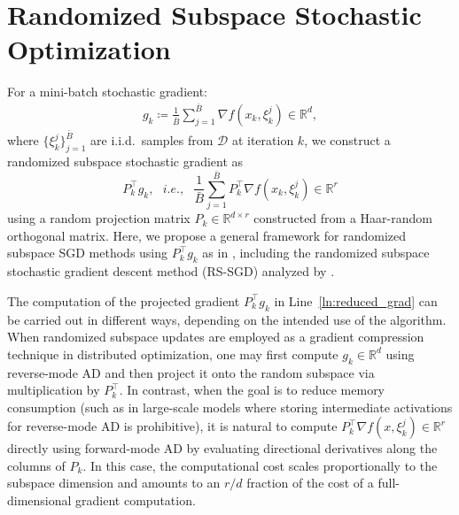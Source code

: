 \documentclass[10pt]{article}
\makeatletter
\newcommand{\alglinelabel}{
  \addtocounter{ALC@line}{-1}
  \refstepcounter{ALC@line}
  \label
}
\makeatother
\begin{document}
\section{Randomized Subspace Stochastic Optimization}
\label{sec:algorithm}
For a mini-batch stochastic gradient:
\begin{align*} 
\textstyle
g_k \coloneqq \frac{1}{\bar{B}} \sum_{j=1}^{\bar{B}} \nabla f(x_k, \xi_k^j) \in \mathbb{R}^d,
\end{align*}
where $\{\xi_k^j\}_{j=1}^{\bar{B}}$ are i.i.d.\ samples 
from $\mathcal{D}$ at iteration $k$, we construct
 a randomized subspace stochastic gradient as
\[
\textstyle
P_k^\top g_k, ~~~ { i.e., } ~~~
\frac{1}{\bar{B}} \sum_{j=1}^{\bar{B}} P_k^\top \nabla f(x_k, \xi_k^j)  \in \mathbb{R}^r
\]
using a random projection matrix $P_k \in \mathbb{R}^{d\times r}$ constructed from a Haar-random orthogonal matrix.
Here, we propose a general framework for randomized subspace SGD methods using $P_k^\top g_k$ as in , including the randomized subspace stochastic gradient descent method (RS-SGD) analyzed by \citet{flynn2024}.

\begin{algorithm}[t]
\caption{Randomized Subspace Stochastic Optimization with Scaling Function $\phi$}
\label{alg:rs-nsgd}
\end{algorithm}

The computation of the projected gradient $P_k^\top g_k$ in Line~\ref{ln:reduced_grad} can be carried out in different ways, depending on the intended use of the algorithm. When randomized subspace updates are employed as a gradient compression technique in distributed optimization, one may first compute $g_k \in \mathbb{R}^d$ using reverse-mode AD and then project it onto the random subspace via multiplication by $P_k^\top$. In contrast, when the goal is to reduce memory consumption (such as in large-scale models where storing intermediate activations for reverse-mode AD is prohibitive), it is natural to compute $P_k^\top \nabla f(x,\xi_k^j) \in \mathbb{R}^r$ directly using forward-mode AD by evaluating directional derivatives along the columns of $P_k$. In this case, the computational cost scales proportionally to the subspace dimension and amounts to an $r/d$ fraction of the cost of a full-dimensional gradient computation.
\end{document}
